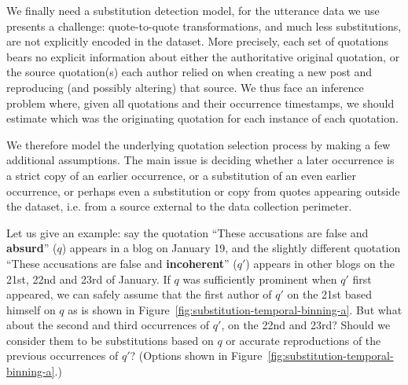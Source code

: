 \label{sec:temporal-binning}

We finally need a substitution detection model, for the utterance data we use presents a challenge: quote-to-quote transformations, and much less substitutions, are not explicitly encoded in the dataset. More precisely, each set of quotations bears no explicit information about either the authoritative original quotation, or the source quotation(s) each author relied on when creating a new post and reproducing (and possibly altering) that source.
We thus face an inference problem where, given all quotations and their occurrence timestamps, we should estimate which was the originating quotation for each instance of each quotation.

We therefore model the underlying quotation selection process by making a few additional assumptions.%
The main issue is deciding whether a later occurrence is a strict copy of an earlier occurrence, or a substitution of an even earlier occurrence, or perhaps even a substitution or copy from quotes appearing outside the dataset, \hbox{i.e.} from a source external to the data collection perimeter.

Let us give an example: say the quotation ``These accusations are false and \textbf{absurd}'' ($q$) appears in a blog on January 19, and the slightly different quotation ``These accusations are false and \textbf{incoherent}'' ($q'$) appears in other blogs on the 21st, 22nd and 23rd of January.
If $q$ was sufficiently prominent when $q'$ first appeared, we can safely assume that the first author of $q'$ on the 21st based himself on $q$ as is shown in Figure~\ref{fig:substitution-temporal-binning-a}.
But what about the second and third occurrences of $q'$, on the 22nd and 23rd?
Should we consider them to be substitutions based on $q$ %
or accurate reproductions of the previous occurrences of $q'$? (Options shown in Figure~\ref{fig:substitution-temporal-binning-a}.)

